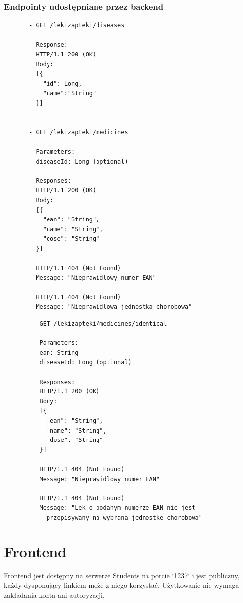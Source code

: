 \documentclass{article}
\begin{document}
    \subsubsection{Endpointy udostępniane przez backend}
    \noindent
    \begin{minipage}{.45\textwidth}
     \begin{lstlisting}
       - GET /lekizapteki/diseases

         Response:
         HTTP/1.1 200 (OK)
         Body:
         [{
           "id": Long,
           "name":"String"
         }]


       - GET /lekizapteki/medicines

         Parameters:
         diseaseId: Long (optional)

         Responses:
         HTTP/1.1 200 (OK)
         Body:
         [{
           "ean": "String",
           "name": "String",
           "dose": "String"
         }]

         HTTP/1.1 404 (Not Found)
         Message: "Nieprawidlowy numer EAN"

         HTTP/1.1 404 (Not Found)
         Message: "Nieprawidlowa jednostka chorobowa"
     \end{lstlisting}
    \end{minipage}\hfill
    \begin{minipage}{.45\textwidth}
      \begin{lstlisting}
        - GET /lekizapteki/medicines/identical

          Parameters:
          ean: String
          diseaseId: Long (optional)

          Responses:
          HTTP/1.1 200 (OK)
          Body:
          [{
            "ean": "String",
            "name": "String",
            "dose": "String"
          }]

          HTTP/1.1 404 (Not Found)
          Message: "Nieprawidlowy numer EAN"

          HTTP/1.1 404 (Not Found)
          Message: "Lek o podanym numerze EAN nie jest
            przepisywany na wybrana jednostke chorobowa"
      \end{lstlisting}
    \end{minipage}

  \section{Frontend}
  Frontend jest dostępny na
  \href{http://students.mimuw.edu.pl:1237}{serwerze Students na porcie `1237`} i jest publiczny,
  każdy dysponujący linkiem może z niego korzystać.
  Użytkowanie nie wymaga zakładania konta ani autoryzacji.
\end{document}
